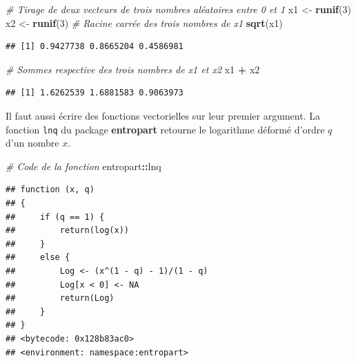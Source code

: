 \documentclass[
  12pt,
  french,
  a4paper,
  extrafontsizes,onecolumn,openright
  ]{memoir}
\newenvironment{Shaded}{\begin{snugshade}}{\end{snugshade}}
\newcommand{\CommentTok}[1]{\textcolor[rgb]{0.56,0.35,0.01}{\textit{#1}}}
\newcommand{\DecValTok}[1]{\textcolor[rgb]{0.00,0.00,0.81}{#1}}
\newcommand{\FunctionTok}[1]{\textcolor[rgb]{0.13,0.29,0.53}{\textbf{#1}}}
\newcommand{\NormalTok}[1]{#1}
\newcommand{\OtherTok}[1]{\textcolor[rgb]{0.56,0.35,0.01}{#1}}
\newcommand{\SpecialCharTok}[1]{\textcolor[rgb]{0.81,0.36,0.00}{\textbf{#1}}}
\begin{document}
\scriptsize

\begin{Shaded}
\begin{Highlighting}[]
\CommentTok{\# Tirage de deux vecteurs de trois nombres aléatoires entre 0 et 1}
\NormalTok{x1 }\OtherTok{\textless{}{-}} \FunctionTok{runif}\NormalTok{(}\DecValTok{3}\NormalTok{)}
\NormalTok{x2 }\OtherTok{\textless{}{-}} \FunctionTok{runif}\NormalTok{(}\DecValTok{3}\NormalTok{)}
\CommentTok{\# Racine carrée des trois nombres de x1}
\FunctionTok{sqrt}\NormalTok{(x1)}
\end{Highlighting}
\end{Shaded}

\begin{verbatim}
## [1] 0.9427738 0.8665204 0.4586981
\end{verbatim}

\begin{Shaded}
\begin{Highlighting}[]
\CommentTok{\# Sommes respective des trois nombres de x1 et x2}
\NormalTok{x1 }\SpecialCharTok{+}\NormalTok{ x2}
\end{Highlighting}
\end{Shaded}

\begin{verbatim}
## [1] 1.6262539 1.6881583 0.9063973
\end{verbatim}

\normalsize

Il faut aussi écrire des fonctions vectorielles sur leur premier argument.
La fonction \texttt{lnq} du package \textbf{entropart} retourne le logarithme déformé d'ordre \(q\) d'un nombre \(x\).

\scriptsize

\begin{Shaded}
\begin{Highlighting}[]
\CommentTok{\# Code de la fonction}
\NormalTok{entropart}\SpecialCharTok{::}\NormalTok{lnq}
\end{Highlighting}
\end{Shaded}

\begin{verbatim}
## function (x, q) 
## {
##     if (q == 1) {
##         return(log(x))
##     }
##     else {
##         Log <- (x^(1 - q) - 1)/(1 - q)
##         Log[x < 0] <- NA
##         return(Log)
##     }
## }
## <bytecode: 0x128b83ac0>
## <environment: namespace:entropart>
\end{verbatim}

\normalsize
\end{document}
